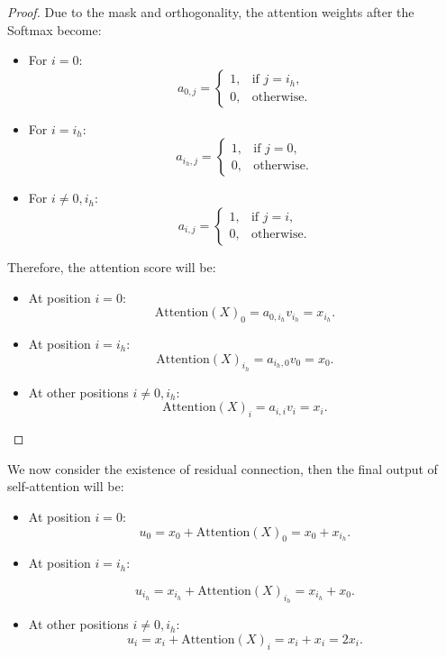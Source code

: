 {\begin{proof}
Due to the mask and orthogonality, the attention weights after the Softmax become:

\begin{itemize}
    \item For \( i = 0 \):
  \[
  a_{0,j} = \begin{cases}
  1, & \text{if } j = i_h, \\
  0, & \text{otherwise}.
  \end{cases}
  \]
  \item For \( i = i_h \):
  \[
  a_{i_h,j} = \begin{cases}
  1, & \text{if } j = 0, \\
  0, & \text{otherwise}.
  \end{cases}
  \]
  \item For \( i \neq 0, i_h \):
  \[
  a_{i,j} = \begin{cases}
  1, & \text{if } j = i, \\
  0, & \text{otherwise}.
  \end{cases}
  \]
  
\end{itemize}
Therefore, the attention score will be: 
\begin{itemize}
    \item At position \( i = 0 \):
  \[
  \text{Attention}(X)_0 = a_{0,i_h} v_{i_h} = x_{i_h}.
  \]
  \item At position \( i = i_h \):
  \[
  \text{Attention}(X)_{i_h} = a_{i_h,0} v_0 = x_0.
  \]
  \item At other positions \( i \neq 0, i_h \):
  \[
  \text{Attention}(X)_i = a_{i,i} v_i = x_i.
  \]
\end{itemize}
\end{proof}
 

We now consider the existence of residual connection, then the final output of self-attention will be:

\begin{itemize}
    \item At position \( i = 0 \):
  \[
  u_0 = x_0 + \text{Attention}(X)_0 = x_0 + x_{i_h}.
  \]
  \item At position \( i = i_h \):

  \[
  u_{i_h} = x_{i_h} + \text{Attention}(X)_{i_h} = x_{i_h} + x_0.
  \]
  \item At other positions \( i \neq 0, i_h \):
  \[
  u_i = x_i + \text{Attention}(X)_i = x_i + x_i = 2 x_i.
  \]
\end{itemize}

}
